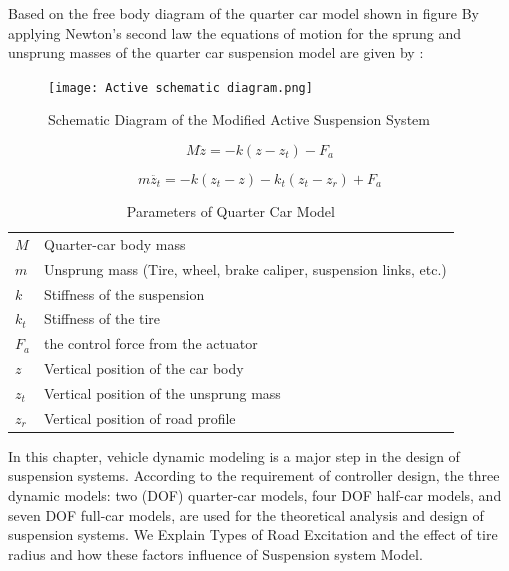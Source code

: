 Based on the free body diagram of the quarter car model shown in figure 
By applying Newton’s second law the equations of 
motion for the sprung and unsprung masses of the quarter
car suspension model are given by \cite{chiou2009using}:
\begin{figure}[H]
	\centering
	\texttt{[image: Active schematic diagram.png]}
	\caption{Schematic Diagram of the Modified Active Suspension System \cite{wong2001theory}}
	\label{fig:Active schematic diagram}
	
\end{figure}
\begin{equation}
	M\ddot{z} = -k(z - z_t) - F_a
	\label{eqn:4.2}
\end{equation}

\begin{equation}
	m\ddot{z_t}=-k(z_t-z)-k_t(z_t-z_r)+ F_a
	\label{eqn:4.1}
\end{equation}
\begin{table}[H]
	\centering
	\caption{Parameters of Quarter Car Model \cite{turkay2005study}}
	\begin{tabular}{ l|l }
		\hline
		$M$   & Quarter-car body mass                                              \\
		$m$   & Unsprung mass (Tire, wheel, brake caliper, suspension links, etc.) \\
		$k$   & Stiffness of the suspension                                        \\
		$k_t$ & Stiffness of the tire                                              \\
		$F_a$ &  the control force from the actuator                  \\
		$z$   & Vertical position of the car body                                  \\
		$z_t$ & Vertical position of the unsprung mass                             \\
		$z_r$ & Vertical position of road profile                                  \\
		\hline
	\end{tabular}
	\label{table:qcm}
\end{table}


In this chapter, vehicle dynamic modeling is a major step in the design of suspension systems. According to the requirement of controller design, the three dynamic models: two (DOF) quarter-car models, four DOF half-car models, and seven DOF full-car models, are used for the theoretical analysis and design of suspension systems. \cite{sun2020advanced}
We Explain Types of Road Excitation and the effect of tire radius and how these factors influence of Suspension system Model.

